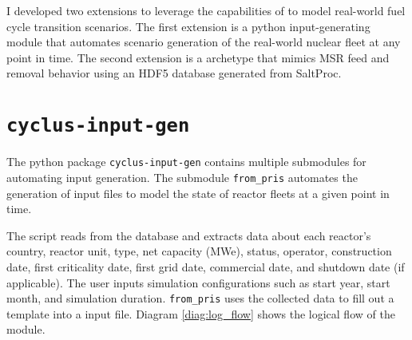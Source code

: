 I developed two extensions to leverage 
the capabilities of \Cyclus to model
real-world fuel cycle transition scenarios.
The first extension is a python input-generating module
that automates scenario generation of the real-world 
nuclear fleet at any point in time. The second extension
is a \Cyclus archetype that mimics \gls{MSR} feed and removal
behavior using an HDF5 database generated from SaltProc.

\section{\texttt{cyclus-input-gen}}
\label{sec:writeinput}
The python package \texttt{cyclus-input-gen} contains
multiple submodules for automating \Cyclus input generation.
The submodule \texttt{from\_pris} automates the generation of \Cyclus input files
to model the state of reactor fleets at a given
point in time.

The script reads from the  database \cite{iaea_nuclear_2018}
and extracts data about each reactor's country, reactor unit,
type, net capacity (MWe), status, operator, construction date,
first criticality date, first grid date, commercial date,
and shutdown date (if applicable). The user inputs simulation
configurations such as start year, start month, and
simulation duration. \texttt{from\_pris} uses the collected data to
fill out a template into a \Cyclus input file. 
Diagram \ref{diag:log_flow} shows the logical flow of the module.


